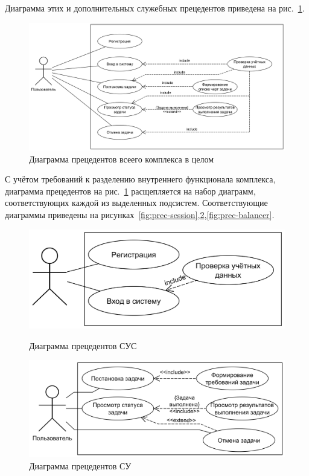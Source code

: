 \documentclass[a4paper,12pt]{report}
\numberwithin{equation}{section}
\begin{document}
Диаграмма этих и дополнительных служебных прецедентов приведена на рис.~\ref{fig:prec-common}.

\begin{figure}[b]
  \centering
  \includegraphics[width=.9\linewidth]{diagrams/common/usecase}
  \caption{Диаграмма прецедентов всеего комплекса в целом}
  \label{fig:prec-common}
\end{figure}

С учётом требований к разделению внутреннего функционала комплекса, диаграмма прецедентов на рис.~\ref{fig:prec-common}
расщепляется на набор диаграмм, соответствующих каждой из выделенных подсистем.
Соответствующие диаграммы приведены на рисунках~\ref{fig:prec-session},\ref{fig:prec-logic},\ref{fig:prec-balancer}.

\begin{figure}
  \centering
  \begin{minipage}{.49\linewidth}
    \centering
    \includegraphics[width=\linewidth]{diagrams/session/usecase}
    \caption{Диаграмма прецедентов СУС}
    \label{fig:prec-session}
  \end{minipage}
  \hfill
  \begin{minipage}{.49\linewidth}
    \centering
    \includegraphics[width=\linewidth]{diagrams/logic/usecase}
    \caption{Диаграмма прецедентов СУ}
    \label{fig:prec-logic}
  \end{minipage}  
\end{figure}
\end{document}
